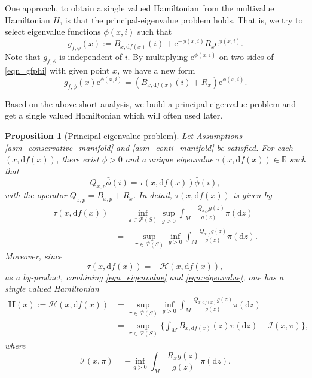 \documentclass[a4paper]{article}
\numberwithin{equation}{section}
\newtheorem{proposition}[theorem]{Proposition}
\theoremstyle{definition}
\begin{document}
One approach, to obtain a single valued Hamiltonian from the multivalue Hamiltonian $H$, is that the principal-eigenvalue problem holds. That is, we try to select eigenvalue functions $\phi(x,i)$ such that
\begin{equation}\label{eqn_gfphi}
	g_{f,\phi}(x):=B_{x,\mathrm{d}f(x)}(i)+\mathrm{e}^{-\phi(x,i)}R_x\mathrm{e}^{\phi(x,i)}.
\end{equation}
Note that $g_{f,\phi}$ is independent of $i$. 
By multiplying $\mathrm{e}^{\phi(x, i)}$ on two sides of \eqref{eqn_gfphi} with given point $x$, we have a new form
\begin{equation*}
    g_{f,\phi}(x)\mathrm{e}^{\phi(x, i)}=(B_{x,\mathrm{d}f(x)}(i)+R_x)\mathrm{e}^{\phi(x,i)}.
\end{equation*}
\par
Based on the above short analysis, we build a principal-eigenvalue problem and get a single valued Hamiltonian which will often used later.
\begin{proposition}[Principal-eigenvalue problem]\label{lem_eigen} Let Assumptions \ref{asm_conservative_manifold} and \cref{asm_conti_manifold} be satisfied. 
	For each $(x,\mathrm{d}f(x))$, there exist $\bar{\phi}>0$ and a unique eigenvalue $\tau(x,\mathrm{d}f(x))\in \mathbb{R}$ such that
\begin{equation}\label{eigenvalue}
	Q_{x,p}\bar{\phi}(i)=\tau(x,\mathrm{d}f(x))\bar{\phi}(i),
\end{equation}
with the operator $Q_{x,p}=B_{x,p}+R_x$. In detail, $\tau(x,\mathrm{d}f(x))$ is given by
\begin{equation}\label{eqn_eigenvalue}
\begin{split}
	\tau(x,\mathrm{d}f(x))&=\inf_{\pi\in \mathcal{P}(S)}\sup_{g>0}\int_M\frac{-Q_{x,p}g(z)}{g(z)}\pi(\text{d}z)\\
	&=-\sup_{\pi\in\mathcal{P}(S)}\inf_{g>0}\int_M\frac{Q_{x,p}g(z)}{g(z)}\pi(\text{d}z).
\end{split}
\end{equation}
Moreover, since 
\begin{equation}\label{eqn:eigenvalue}
	\tau(x,\mathrm{d}f(x))=-\mathcal{H}(x,\mathrm{d}f(x)),
\end{equation}
as a by-product, combining \eqref{eqn_eigenvalue} and \eqref{eqn:eigenvalue}, one has a single valued Hamiltonian 
\begin{equation}\label{eqn_Hxp}
\begin{split}
	\mathbf{H}(x):=\mathcal{H}(x,\mathrm{d}f(x))&=\sup_{\pi\in\mathcal{P}(S)}\inf_{g>0}\int_M\frac{Q_{x,\mathrm{d}f(x)}g(z)}{g(z)}\pi(\text{d}z)\\
	&=\sup_{\pi\in\mathcal{P}(S)}\big\{\int_M B_{x,\mathrm{d}f(x)}(z)\pi(\text{d}z)-\mathcal{I}(x,\pi)\big\},
\end{split}
\end{equation}
where
\begin{equation}\label{eqn_I(x,pi)}
	\mathcal{I}(x,\pi)=-\inf_{g>0}\int_M\frac{R_xg(z)}{g(z)}\pi(\text{d}z).
\end{equation}
\end{proposition}
\end{document}
